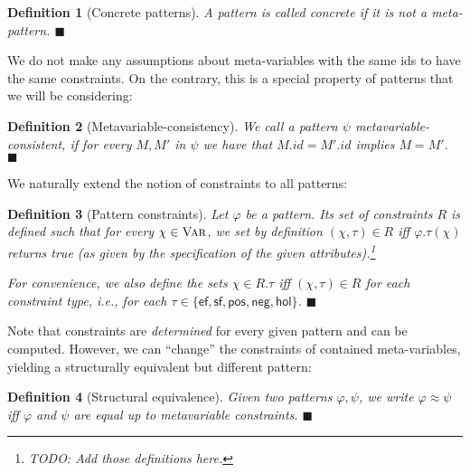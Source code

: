 \documentclass{article}
\newcommand{\xqed}[1]{%
    \leavevmode\unskip\penalty9999 \hbox{}\nobreak\hfill
    \quad\hbox{\ensuremath{#1}}}
\newcommand{\xqedhere}{\xqed{\blacksquare}}
\newtheorem{deff}{Definition}
\newenvironment{definition}[1]{%
  \begin{deff}#1}{%
  \xqedhere\end{deff}%
}
\numberwithin{deff}{section}
\numberwithin{lemma*}{section}
\newcommand{\Var}{\textsc{Var}}
\newcommand{\s}[1]{\{ #1 \}}
\newcommand{\Ef}{\mathsf{ef}}
\newcommand{\Sf}{\mathsf{sf}}
\newcommand{\Pos}{\mathsf{pos}}
\newcommand{\Neg}{\mathsf{neg}}
\newcommand{\Hol}{\mathsf{hol}}
\begin{document}
\begin{definition}[Concrete patterns]
  A pattern is called \emph{concrete} if it is not a meta-pattern.
\end{definition}

We do not make any assumptions about meta-variables with the same ids to have the same constraints.
On the contrary, this is a special property of patterns that we will be considering:
\begin{definition}[Metavariable-consistency]
  We call a pattern $\psi$ \emph{metavariable-consistent}, if for every $M, M'$ in $\psi$ we have that $M.id = M'.id$ implies $M = M'$.
\end{definition}

\iffalse
\begin{definition}[Pattern renaming]
  Let $\varphi$ a pattern.
  Then $\psi$ is a renaming of $\varphi$ if there is a variable renaming $s : \Var \to \Var$ such that $\psi s$ is $\alpha$-equivalent to $\varphi$.
\end{definition}
\fi

We naturally extend the notion of constraints to all patterns:

\begin{definition}[Pattern constraints]
  Let $\varphi$ be a pattern.
  Its set of constraints $R$ is defined such that for every $\chi \in \Var$, we set by definition $(\chi, \tau) \in R$ iff $\varphi.\tau(\chi)$ returns true (as given by the specification of the given attributes).\footnote{TODO: Add those definitions here.}

  For convenience, we also define the sets $\chi \in R.\tau$ iff $(\chi, \tau) \in R$ for each constraint type, i.e., for each $\tau \in \s{\Ef, \Sf, \Pos, \Neg, \Hol}$.
\end{definition}

Note that constraints are \emph{determined} for every given pattern and can be computed.
However, we can ``change'' the constraints of contained meta-variables, yielding a structurally equivalent but different pattern:
\begin{definition}[Structural equivalence]
  Given two patterns $\varphi, \psi$, we write $\varphi \approx \psi$ iff $\varphi$ and $\psi$ are equal up to metavariable constraints.
\end{definition}
\end{document}
